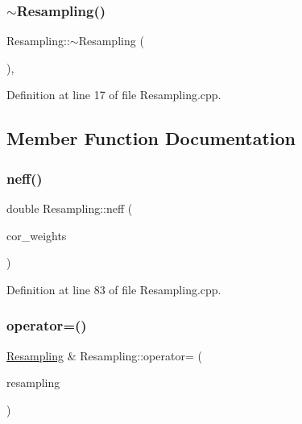 \subsubsection{\texorpdfstring{$\sim$\+Resampling()}{~Resampling()}}
{\footnotesize\ttfamily Resampling\+::$\sim$\+Resampling (\begin{DoxyParamCaption}{ }\end{DoxyParamCaption})\hspace{0.3cm}{\ttfamily [virtual]}, {\ttfamily [noexcept]}}



Definition at line 17 of file Resampling.\+cpp.



\subsection{Member Function Documentation}
\mbox{\label{classbfl_1_1Resampling_af1fbc21ffc2fb10f14b79210de57d614}} 
\subsubsection{\texorpdfstring{neff()}{neff()}}
{\footnotesize\ttfamily double Resampling\+::neff (\begin{DoxyParamCaption}\item[{const Eigen\+::\+Ref$<$ const Eigen\+::\+Vector\+Xd $>$ \&}]{cor\+\_\+weights }\end{DoxyParamCaption})\hspace{0.3cm}{\ttfamily [virtual]}}



Definition at line 83 of file Resampling.\+cpp.

\mbox{\label{classbfl_1_1Resampling_a139238a96264afe71858445d8f2c137a}} 
\subsubsection{\texorpdfstring{operator=()}{operator=()}\hspace{0.1cm}{\footnotesize\ttfamily [1/3]}}
{\footnotesize\ttfamily \mbox{\hyperlink{classbfl_1_1Resampling}{Resampling}} \& Resampling\+::operator= (\begin{DoxyParamCaption}\item[{const \mbox{\hyperlink{classbfl_1_1Resampling}{Resampling}} \&}]{resampling }\end{DoxyParamCaption})}



